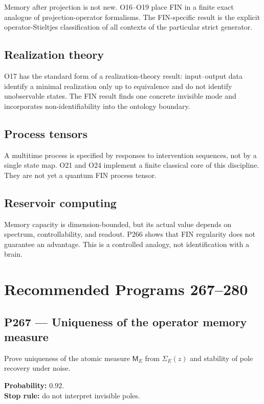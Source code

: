 \documentclass[11pt,a4paper,openany]{report}
\begin{document}
Memory after projection is not new. O16--O19 place FIN in a finite exact analogue of projection-operator formalisms. The FIN-specific result is the explicit operator-Stieltjes classification of all contexts of the particular strict generator.

\section{Realization theory}

O17 has the standard form of a realization-theory result: input--output data identify a minimal realization only up to equivalence and do not identify unobservable states. The FIN result finds one concrete invisible mode and incorporates non-identifiability into the ontology boundary.

\section{Process tensors}

A multitime process is specified by responses to intervention sequences, not by a single state map. O21 and O24 implement a finite classical core of this discipline. They are not yet a quantum FIN process tensor.

\section{Reservoir computing}

Memory capacity is dimension-bounded, but its actual value depends on spectrum, controllability, and readout. P266 shows that FIN regularity does not guarantee an advantage. This is a controlled analogy, not identification with a brain.

\chapter{Recommended Programs 267--280}

\section{P267 --- Uniqueness of the operator memory measure}

Prove uniqueness of the atomic measure \(\mathsf M_E\) from \(\Sigma_E(z)\) and stability of pole recovery under noise.

\textbf{Probability:} 0.92.\\
\textbf{Stop rule:} do not interpret invisible poles.
\end{document}

